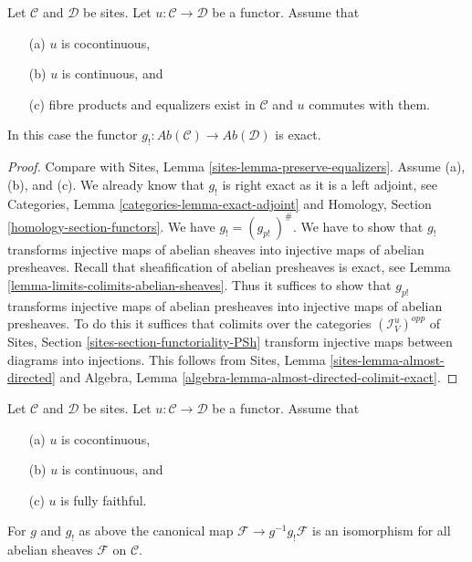 \begin{lemma}
\label{lemma-exactness-lower-shriek}
Let $\mathcal{C}$ and $\mathcal{D}$ be sites.
Let $u : \mathcal{C} \to \mathcal{D}$ be a functor.
Assume that
\begin{enumerate}
\item[(a)] $u$ is cocontinuous,
\item[(b)] $u$ is continuous, and
\item[(c)] fibre products and equalizers exist in $\mathcal{C}$ and
$u$ commutes with them.
\end{enumerate}
In this case the functor
$g_! : \textit{Ab}(\mathcal{C}) \to \textit{Ab}(\mathcal{D})$
is exact.
\end{lemma}

\begin{proof}
Compare with
Sites, Lemma \ref{sites-lemma-preserve-equalizers}.
Assume (a), (b), and (c).
We already know that $g_!$ is right exact as it is a left adjoint, see
Categories, Lemma \ref{categories-lemma-exact-adjoint} and
Homology, Section \ref{homology-section-functors}.
We have $g_! = (g_{p!}\ )^\#$. We have to show that
$g_!$ transforms injective maps of abelian sheaves into injective maps
of abelian presheaves.
Recall that sheafification of abelian presheaves is exact, see
Lemma \ref{lemma-limits-colimits-abelian-sheaves}.
Thus it suffices to show that $g_{p!}$ transforms injective maps of
abelian presheaves into injective maps of abelian presheaves.
To do this it suffices that colimits over the categories
$(\mathcal{I}_V^u)^{opp}$ of
Sites, Section \ref{sites-section-functoriality-PSh}
transform injective maps between diagrams into injections.
This follows from
Sites, Lemma \ref{sites-lemma-almost-directed}
and
Algebra, Lemma \ref{algebra-lemma-almost-directed-colimit-exact}.
\end{proof}

\begin{lemma}
\label{lemma-back-and-forth}
Let $\mathcal{C}$ and $\mathcal{D}$ be sites.
Let $u : \mathcal{C} \to \mathcal{D}$ be a functor.
Assume that
\begin{enumerate}
\item[(a)] $u$ is cocontinuous,
\item[(b)] $u$ is continuous, and
\item[(c)] $u$ is fully faithful.
\end{enumerate}
For $g$ and $g_!$ as above the canonical map
$\mathcal{F} \to g^{-1}g_!\mathcal{F}$ is an isomorphism
for all abelian sheaves $\mathcal{F}$ on $\mathcal{C}$.
\end{lemma}

